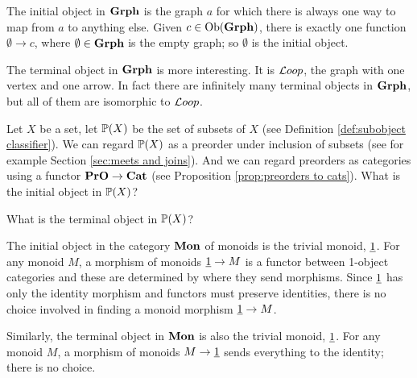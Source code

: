 \documentclass[CT4S-EN-RU]{subfiles}
\begin{document}
\begin{exampleRUS}\label{ex:universal obs in set}
\end{exampleRUS}

\begin{exampleENG}
The initial object in ${\mathbf{Grph}}$ is the graph $a$ for which there is always one way to map from $a$ to anything else. Given $c\in\textnormal{Ob}({\mathbf{Grph}})$, there is exactly one function $\emptyset\to c$, where $\emptyset\in{\mathbf{Grph}}$ is the empty graph; so $\emptyset$ is the initial object.

The terminal object in ${\mathbf{Grph}}$ is more interesting. It is ${\mathcal{L} oop}$, the graph with one vertex and one arrow. In fact there are infinitely many terminal objects in ${\mathbf{Grph}}$, but all of them are isomorphic to ${\mathcal{L} oop}$. 
\end{exampleENG}

\begin{exampleRUS}
\end{exampleRUS}

\begin{exerciseENG}
Let $X$ be a set, let ${\mathbb P}(X)$ be the set of subsets of $X$ (see Definition \ref{def:subobject classifier}). We can regard ${\mathbb P}(X)$ as a preorder under inclusion of subsets (see for example Section \ref{sec:meets and joins}). And we can regard preorders as categories using a functor ${\mathbf{PrO}}\rightarrow{\mathbf{Cat}}$ (see Proposition \ref{prop:preorders to cats}).
\sexc What is the initial object in ${\mathbb P}(X)$?
\item What is the terminal object in ${\mathbb P}(X)$? 
\endsexc
\end{exerciseENG}

\begin{exerciseRUS}
\end{exerciseRUS}

\begin{exampleENG}\label{ex:initial monoid terminal monoid}
The initial object in the category ${\mathbf{Mon}}$ of monoids is the trivial monoid, $\underline{1}$. For any monoid $M$, a morphism of monoids $\underline{1}\rightarrow M$ is a functor between 1-object categories and these are determined by where they send morphisms. Since $\underline{1}$ has only the identity morphism and functors must preserve identities, there is no choice involved in finding a monoid morphism $\underline{1}\rightarrow M$.

Similarly, the terminal object in ${\mathbf{Mon}}$ is also the trivial monoid, $\underline{1}$. For any monoid $M$, a morphism of monoids $M\rightarrow\underline{1}$ sends everything to the identity; there is no choice.
\end{exampleENG}
\end{document}
